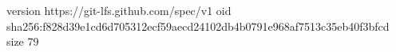 version https://git-lfs.github.com/spec/v1
oid sha256:f828d39e1cd6d705312ecf59aecd24102db4b0791e968af7513c35eb40f3bfcd
size 79
